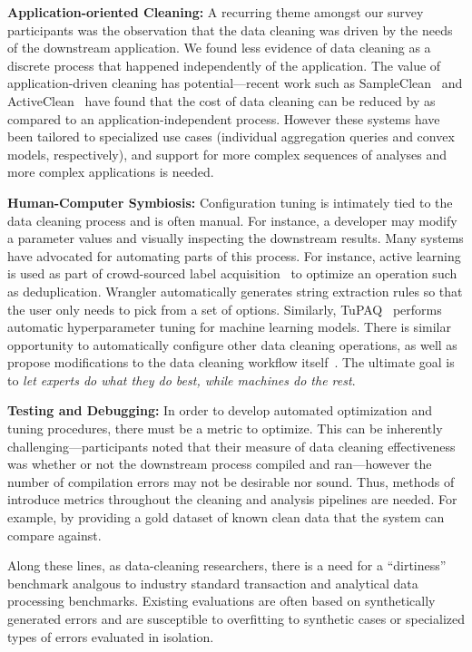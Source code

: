 \noindent\textbf{Application-oriented Cleaning:}  A recurring theme amongst our survey participants was the observation that the data cleaning was driven by the needs of the downstream application.  We found less evidence of data cleaning as a discrete process that happened independently of the application.  The value of application-driven cleaning has potential---recent work such as SampleClean~\cite{DBLP:journals/debu/KrishnanWFGKM015} and ActiveClean~\cite{activecleanarxiv} have found that the cost of data cleaning can be reduced by {\color{red}{an order of magnitude or more}} as compared to an application-independent process.   However these systems have been tailored to specialized use cases (individual aggregation queries and convex models, respectively), and support for more complex sequences of analyses and more complex applications is needed.

\noindent\textbf{Human-Computer Symbiosis:}  Configuration tuning is intimately tied to the data cleaning process and is often manual.  For instance, a developer may modify a parameter values and visually inspecting the downstream results.  Many systems have advocated for automating parts of this process.  For instance, active learning is used as part of crowd-sourced label acquisition~\cite{gokhale2014corleone,DBLP:journals/pvldb/HaasW0F15} to optimize an operation such as deduplication.  Wrangler automatically generates string extraction rules so that the user only needs to pick from a set of options.  Similarly, TuPAQ~\cite{sparks2015automating} performs automatic hyperparameter tuning for machine learning models.   There is similar opportunity to automatically configure other data cleaning operations, as well as propose modifications to the data cleaning workflow itself~\cite{wisteria}.  The ultimate goal is to {\it let experts do what they do best, while machines do the rest}.


\noindent\textbf{Testing and Debugging:} In order to develop automated optimization and tuning procedures, there must be a metric to optimize.  This can be inherently challenging---participants noted that their measure of data cleaning effectiveness was whether or not the downstream process compiled and ran---however the number of compilation errors may not be desirable nor sound.  Thus, methods of introduce metrics throughout the cleaning and analysis pipelines are needed.  For example, by providing a gold dataset of known clean data that the system can compare against.  

Along these lines, as data-cleaning researchers, there is a need for a ``dirtiness'' benchmark analgous to industry standard transaction and analytical data processing benchmarks.  Existing evaluations are often based on synthetically generated errors and are susceptible to overfitting to synthetic cases or specialized types of errors evaluated in isolation.  

